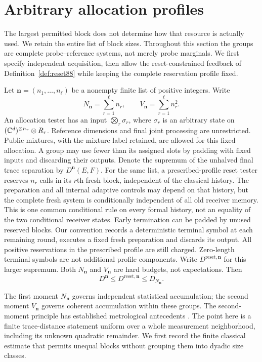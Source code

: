 \section{Arbitrary allocation profiles}
\label{sec:allocation89}
The largest permitted block does not determine how that resource is
actually used.  We retain the entire list of block sizes.  Throughout
this section the groups are complete probe--reference systems, not
merely probe marginals.  We first specify independent acquisition,
then allow the reset-constrained feedback of Definition~\ref{def:reset88}
while keeping the complete reservation profile fixed.

\begin{definition}\label{def:allocation89}
Let $\boldsymbol n=(n_1,\ldots,n_\ell)$ be a nonempty finite list of
positive integers.  Write
\[
 N_{\boldsymbol n}=\sum_{r=1}^{\ell}n_r,
 \qquad V_{\boldsymbol n}=\sum_{r=1}^{\ell}n_r^2.
\]
An allocation tester has an input
$\bigotimes_r\sigma_r$, where $\sigma_r$ is an arbitrary state on
$(\mathbb C^d)^{\otimes n_r}\otimes R_r$.  Reference dimensions and final
joint processing are unrestricted.  Public mixtures, with the
mixture label retained, are allowed for this fixed allocation.
A group may use fewer than its assigned slots by padding with fixed
inputs and discarding their outputs.  Denote the supremum of the
unhalved final trace separation by $D^{\boldsymbol n}(E,F)$.
For the same list, a prescribed-profile reset tester reserves $n_r$
calls in its $r$th fresh block, independent of the classical history.
The preparation and all internal adaptive controls may depend on that
history, but the complete fresh system is conditionally independent
of all old receiver memory.  This is one common conditional rule on
every formal history, not an equality of the two conditional receiver
states.  Early termination can be padded by unused reserved blocks.
Our convention records a deterministic terminal symbol at each remaining
round, executes a fixed fresh preparation and discards its output.  All
positive reservations in the prescribed profile are still charged.
Zero-length terminal symbols are not additional profile components.
Write $D^{\mathrm{reset},\boldsymbol n}$ for this larger supremum.
Both $N_{\boldsymbol n}$ and $V_{\boldsymbol n}$ are hard budgets,
not expectations.  Then
\[
 D^{\boldsymbol n}\le D^{\mathrm{reset},\boldsymbol n}\le D_{N_{\boldsymbol n}}.
\]
\end{definition}

The first moment $N_{\boldsymbol n}$ governs independent statistical
accumulation; the second moment $V_{\boldsymbol n}$ governs coherent
accumulation within these groups.  The second-moment principle has
established metrological antecedents \cite{Hyllus78,Toth78}.  The point
here is a finite trace-distance statement uniform over a whole
measurement neighborhood, including its unknown quadratic remainder.
We first record the finite classical estimate that permits unequal
blocks without grouping them into dyadic size classes.

